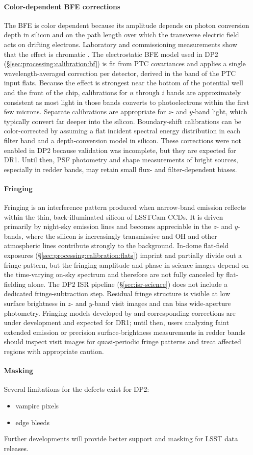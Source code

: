 \paragraph{Color-dependent BFE corrections}
The BFE is color dependent because its amplitude depends on photon conversion depth in silicon and on the path length over which the transverse electric field acts on drifting electrons.
Laboratory and commissioning measurements show that the effect is chromatic \citep[$a_{00}^{y-band} = 0.94 \times a_{00}^{r-band}$, see][]{2024PASP..136d5003B}.
The electrostatic BFE model used in DP2 (\S\ref{sec:processing:calibration:bf}) is fit from PTC covariances and applies a single wavelength-averaged correction per detector, derived in the band of the PTC input flats.
Because the effect is strongest near the bottom of the potential well and the front of the chip, calibrations for $u$ through $i$ bands are approximately consistent as most light in those bands converts to photoelectrons within the first few microns.
Separate calibrations are appropriate for $z$- and $y$-band light, which typically  convert far deeper into the silicon.
Boundary-shift calibrations can be color-corrected by assuming a flat incident spectral energy distribution in each filter band and a depth-conversion model in silicon.
These corrections were not enabled in DP2 because validation was incomplete, but they are expected for DR1.
Until then, PSF photometry and shape measurements of bright sources, especially in redder bands, may retain small flux- and filter-dependent biases.

\paragraph{Fringing}
Fringing is an interference pattern produced when narrow-band emission reflects within the thin, back-illuminated silicon of LSSTCam CCDs.
It is driven primarily by night-sky emission lines and becomes appreciable in the $z$- and $y$-bands, where the silicon is increasingly transmissive and OH and other atmospheric lines contribute strongly to the background.
In-dome flat-field exposures (\S\ref{sec:processing:calibration:flats}) imprint and partially divide out a fringe pattern, but the fringing amplitude and phase in science images depend on the time-varying on-sky spectrum and therefore are not fully canceled by flat-fielding alone.
The DP2 ISR pipeline (\S\ref{sec:isr-science}) does not include a dedicated fringe-subtraction step.
Residual fringe structure is visible at low surface brightness in $z$- and $y$-band visit images and can bias wide-aperture photometry.
Fringing models developed by \citet{2023PASP..135c4503G} and corresponding corrections are under development and expected for DR1; until then, users analyzing faint extended emission or precision surface-brightness measurements in redder bands should inspect visit images for quasi-periodic fringe patterns and treat affected regions with appropriate caution.

\paragraph{Masking}
Several limitations for the defects exist for DP2:
\begin{itemize}
\item vampire pixels
\item edge bleeds
\end{itemize}
Further developments will provide better support and masking for LSST data releases.